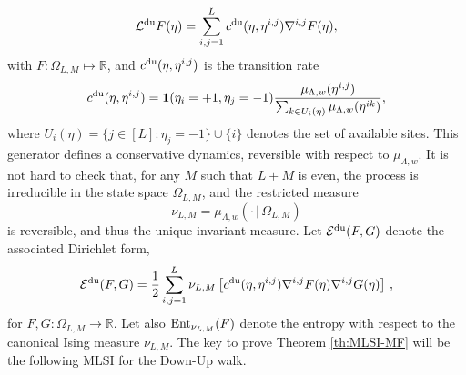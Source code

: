 \documentclass[11pt,reqno]{amsart}
\numberwithin{equation}{section}
\numberwithin{figure}{section}
\newcommand{\ent}{{\rm Ent}}
\newcommand{\1}{\mathds{1}}
\newcommand{\tc}{\,|\,}
\let\O=\Omega
\let\L=\Lambda
\newcommand{\bbR}{{\ensuremath{\mathbb R}} }
\begin{document}
\begin{equation}\label{GenDU}
\mathcal{L}^{\rm du}F(\eta) = \sum_{i,j=1}^L c^{\rm du}(\eta,\eta^{i,j}) \nabla^{i,j}F(\eta),
\end{equation}
with $F:\Omega_{L,M}\mapsto \bbR$, and \(c^{\rm du}(\eta,\eta^{i,j})\) is the transition rate 
\begin{equation}\label{RatesDU}
c^{\rm du}(\eta,\eta^{i,j}) = \mathbf{1}(\eta_i = +1,\eta_j = -1)
\frac{\mu_{\L,w}(\eta^{i,j})}{\sum_{k \in U_i(\eta)} \mu_{\L,w}(\eta^{ik})},
\end{equation}
where \(U_i(\eta) = \{j \in [L] : \eta_j = -1\} \cup \{i\}\) denotes the set of available sites. This generator defines a conservative dynamics, reversible with respect to \(\mu_{\L,w}\).
It is not hard to check that, for any $M$ such that $L+M$ is even, the process is irreducible in the state space $\O_{L,M}$, and the restricted measure 
\begin{equation}\label{RestrDU}
\nu_{L,M}= \mu_{\L,w}\left(\cdot\tc\O_{L,M}\right)
\end{equation}
is reversible, and thus the unique invariant measure. Let \(\mathcal{E}^{\rm du}(F,G)\) denote the associated Dirichlet form,
\begin{equation}\label{DirDU}
\mathcal{E}^{\rm du}(F,G) =  \frac{1}{2} \sum_{i,j=1}^L \nu_{L,M}
\left[ c^{\rm du}(\eta,\eta^{i,j})\nabla^{i,j}F(\eta)\nabla^{i,j}G(\eta) \right]\,, 
\end{equation}
for \(F,G : \Omega_{L,M} \to \mathbb{R}\).
Let also $\ent_{\nu_{L,M}}(F)$ denote the entropy with respect to the canonical Ising measure $\nu_{L,M}$.
  The key to prove Theorem \ref{th:MLSI-MF} will be the following MLSI for the Down-Up walk. 
\end{document}
